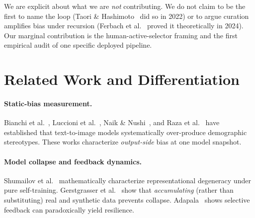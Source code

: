 \documentclass[manuscript, nonacm, screen, review]{acmart}
\begin{document}
We are explicit about what we are \emph{not} contributing. We do not claim to be the first to name the loop (Taori \& Hashimoto~\cite{taori2022data} did so in 2022) or to argue curation amplifies bias under recursion (Ferbach et al.~\cite{ferbach2024selfconsuming} proved it theoretically in 2024). Our marginal contribution is the human-active-selector framing and the first empirical audit of one specific deployed pipeline.

\section{Related Work and Differentiation}
\label{sec:related}

\paragraph{Static-bias measurement.} Bianchi et al.~\cite{bianchi2023easily}, Luccioni et al.~\cite{luccioni2023stable}, Naik \& Nushi~\cite{naik2023social}, and Raza et al.~\cite{raza2025prompting} have established that text-to-image models systematically over-produce demographic stereotypes. These works characterize \emph{output-side} bias at one model snapshot.

\paragraph{Model collapse and feedback dynamics.} Shumailov et al.~\cite{shumailov2024curse} mathematically characterize representational degeneracy under pure self-training. Gerstgrasser et al.~\cite{gerstgrasser2024inevitable} show that \emph{accumulating} (rather than substituting) real and synthetic data prevents collapse. Adapala~\cite{adapala2025antiouroboros} shows selective feedback can paradoxically yield resilience.
\end{document}
